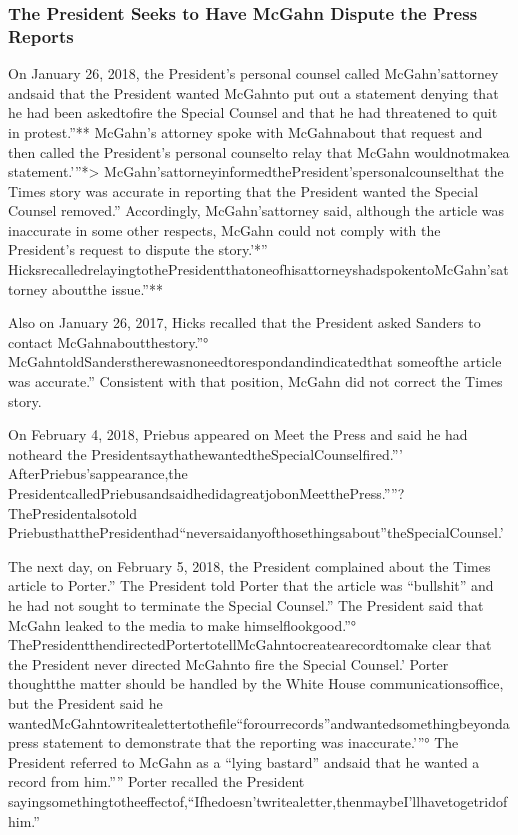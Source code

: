 \subsubsection{The President Seeks to Have McGahn Dispute the Press Reports}

On January 26, 2018, the President’s personal counsel called McGahn’sattorney andsaid that the President wanted McGahnto put out a statement denying that he had been askedtofire the Special Counsel and that he had threatened to quit in protest.”** McGahn’s attorney spoke with McGahnabout that request and then called the President’s personal counselto relay that McGahn wouldnotmakea statement.’”*> McGahn’sattorneyinformedthePresident’spersonalcounselthat the Times story was accurate in reporting that the President wanted the Special Counsel removed.” Accordingly, McGahn’sattorney said, although the article was inaccurate in some other respects, McGahn could not comply with the President’s request to dispute the story.’*” HicksrecalledrelayingtothePresidentthatoneofhisattorneyshadspokentoMcGahn’sattorney aboutthe issue.”**

Also on January 26, 2017, Hicks recalled that the President asked Sanders to contact McGahnaboutthestory.”° McGahntoldSanderstherewasnoneedtorespondandindicatedthat someofthe article was accurate.” Consistent with that position, McGahn did not correct the Times story.

On February 4, 2018, Priebus appeared on Meet the Press and said he had notheard the PresidentsaythathewantedtheSpecialCounselfired.”' AfterPriebus’sappearance,the PresidentcalledPriebusandsaidhedidagreatjobonMeetthePress.””? ThePresidentalsotold PriebusthatthePresidenthad“neversaidanyofthosethingsabout”theSpecialCounsel.’

The next day, on February 5, 2018, the President complained about the Times article to Porter.” The President told Porter that the article was “bullshit” and he had not sought to terminate the Special Counsel.” The President said that McGahn leaked to the media to make himselflookgood.”° ThePresidentthendirectedPortertotellMcGahntocreatearecordtomake clear that the President never directed McGahnto fire the Special Counsel.’ Porter thoughtthe matter should be handled by the White House communicationsoffice, but the President said he wantedMcGahntowritealettertothefile“forourrecords”andwantedsomethingbeyondapress statement to demonstrate that the reporting was inaccurate.’”° The President referred to McGahn as a “lying bastard” andsaid that he wanted a record from him.”” Porter recalled the President sayingsomethingtotheeffectof,“Ifhedoesn’twritealetter,thenmaybeI'llhavetogetridof him.”

